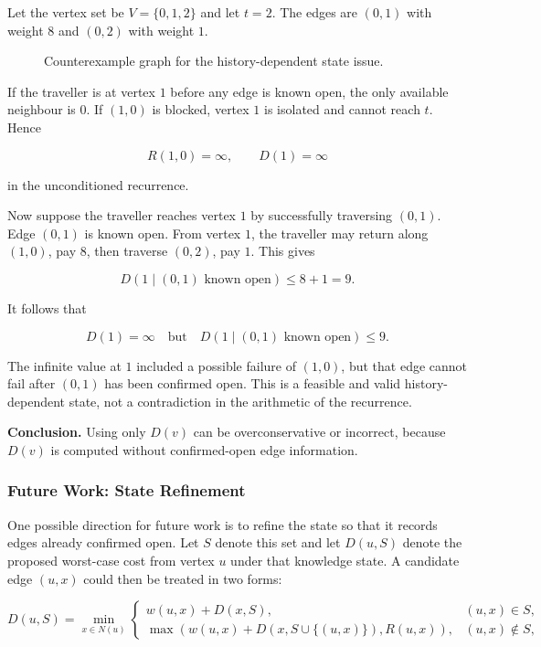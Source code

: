 \documentclass{article}
\begin{document}
Let the vertex set be $V=\{0,1,2\}$ and let $t=2$. The edges are $(0,1)$ with weight $8$ and $(0,2)$ with weight $1$.

\begin{figure}[h]
\centering
{}
\caption{Counterexample graph for the history-dependent state issue.}
\label{fig:history-state-counterexample}
\end{figure}

If the traveller is at vertex $1$ before any edge is known open, the only available neighbour is $0$. If $(1,0)$ is blocked, vertex $1$ is isolated and cannot reach $t$. Hence

\[
R(1,0)=\infty,
\qquad D(1)=\infty
\]

in the unconditioned recurrence.

Now suppose the traveller reaches vertex $1$ by successfully traversing $(0,1)$. Edge $(0,1)$ is known open. From vertex $1$, the traveller may return along $(1,0)$, pay $8$, then traverse $(0,2)$, pay $1$. This gives

\[
D(1\mid (0,1)\text{ known open}) \leq 8+1=9.
\]

It follows that

\[
D(1)=\infty
\quad\text{but}\quad
D(1\mid (0,1)\text{ known open})\leq 9.
\]

The infinite value at $1$ included a possible failure of $(1,0)$, but that edge cannot fail after $(0,1)$ has been confirmed open. This is a feasible and valid history-dependent state, not a contradiction in the arithmetic of the recurrence.

\noindent\textbf{Conclusion.} Using only $D(v)$ can be overconservative or incorrect, because $D(v)$ is computed without confirmed-open edge information.

\subsubsection{Future Work: State Refinement}

One possible direction for future work is to refine the state so that it records edges already confirmed open. Let $S$ denote this set and let $D(u,S)$ denote the proposed worst-case cost from vertex $u$ under that knowledge state. A candidate edge $(u,x)$ could then be treated in two forms:

\[
D(u,S)=\min_{x\in N(u)}
\begin{cases}
w(u,x)+D(x,S), & (u,x)\in S,\\
\max\left(w(u,x)+D(x,S\cup\{(u,x)\}),R(u,x)\right), & (u,x)\notin S,
\end{cases}
\]
\end{document}
